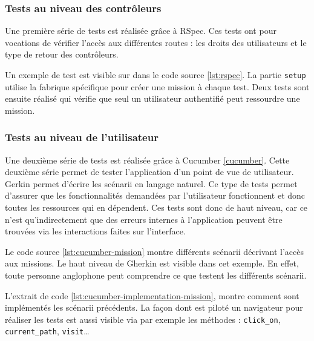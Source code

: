 \subsubsection{Tests au niveau des contrôleurs}
Une première série de tests est réalisée grâce à RSpec. Ces tests ont pour vocations de vérifier l'accès aux différentes routes : les droits des utilisateurs et le type de retour des contrôleurs.

Un exemple de test est visible sur dans le code source \ref{lst:rspec}. La partie \texttt{setup} utilise la fabrique spécifique pour créer une mission à chaque test. Deux tests sont ensuite réalisé qui vérifie que seul un utilisateur authentifié peut ressourdre une mission.



\subsubsection{Tests au niveau de l'utilisateur}
Une deuxième série de tests est réalisée grâce à Cucumber \ref{cucumber}. Cette deuxième série permet de tester l'application d'un point de vue de utilisateur. Gerkin permet d'écrire les scénarii en langage naturel. Ce type de tests permet d'assurer que les fonctionnalités demandées par l'utilisateur fonctionnent et donc toutes les ressources qui en dépendent. Ces tests sont donc de haut niveau, car ce n'est qu’indirectement que des erreurs internes à l'application peuvent être trouvées via les interactions faites sur l'interface.




Le code source \ref{lst:cucumber-mission} montre différents scénarii décrivant l'accès aux missions. Le haut niveau de Gherkin est visible dans cet exemple. En effet, toute personne anglophone peut comprendre ce que testent les différents scénarii. 

L'extrait de code \ref{lst:cucumber-implementation-mission}, montre comment sont implémentés les scénarii précédents. La façon dont est piloté un navigateur pour réaliser les tests est aussi visible via par exemple les méthodes : \texttt{click\_on}, \texttt{current\_path}, \texttt{visit}\ldots

